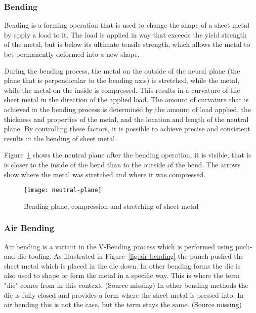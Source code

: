 
\subsubsection{Bending}
Bending is a forming operation that is used to change the shape of a sheet metal by apply a load
to it.
The load is applied in way that exceeds the yield strength of the metal, but is below its
ultimate tensile strength, which allows the metal to bet permanently deformed into a new shape.
\cite[p. 1]{baig_machinelearningprediction_2021}

During the bending process, the metal on the outside of the neural plane (the plane that is
perpendicular to the bending axis) is stretched, while the metal, while the metal on the inside
is compressed.
This results in a curvature of the sheet metal in the direction of the applied load.
\cite[p. 3]{baig_machinelearningprediction_2021}
The amount of curvature that is achieved in the bending process is determined by the amount of
load applied, the thickness and properties of the metal, and the location and length of the
neutral plane. By controlling these factors, it is possible to achieve precise and consistent
results in the bending of sheet metal.

Figure~\ref{fig:neutral-plane} shows the neutral plane after the bending operation, it is
visible, that is is closer to the inside of the bend than to the outside of the bend.
The arrows show where the metal was stretched and where it was compressed.


\begin{figure}[H]
    \centering
    \texttt{[image: neutral-plane]}
    \caption{Bending plane, compression and stretching of sheet metal \cite[p.
    3]{baig_machinelearningprediction_2021}}
    \label{fig:neutral-plane}
\end{figure}

\subsubsection{Air Bending}
Air bending is a variant in the V-Bending process which is performed using puch-and-die tooling.
\cite[p. 416]{groover_fundamentalsmodernmanufacturing_2020}
As illustrated in Figure~\ref{fig:air-bending} the punch pushed the sheet metal which is placed
in the die down.
In other bending forms the die is also used to shape or form the metal in a specific way. This is
where the term "die" comes from in this context. (Source missing)
In other bending methods the die is fully closed and provides a form where the sheet metal is
pressed into. In air bending this is not the case, but the term stays the same. (Source missing)

